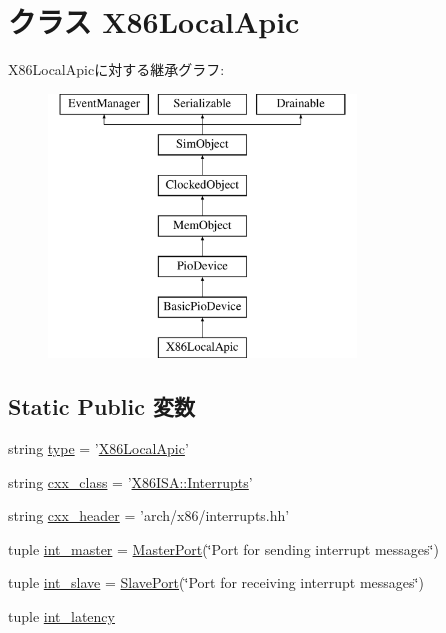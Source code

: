 \hypertarget{classX86LocalApic_1_1X86LocalApic}{
\section{クラス X86LocalApic}
\label{classX86LocalApic_1_1X86LocalApic}
}
X86LocalApicに対する継承グラフ:\begin{figure}[H]
\begin{center}
\leavevmode
\includegraphics[height=7cm]{classX86LocalApic_1_1X86LocalApic}
\end{center}
\end{figure}
\subsection*{Static Public 変数}
\begin{DoxyCompactItemize}
\item 
string \hyperlink{classX86LocalApic_1_1X86LocalApic_acce15679d830831b0bbe8ebc2a60b2ca}{type} = '\hyperlink{classX86LocalApic_1_1X86LocalApic}{X86LocalApic}'
\item 
string \hyperlink{classX86LocalApic_1_1X86LocalApic_a58cd55cd4023648e138237cfc0822ae3}{cxx\_\-class} = '\hyperlink{classX86ISA_1_1Interrupts}{X86ISA::Interrupts}'
\item 
string \hyperlink{classX86LocalApic_1_1X86LocalApic_a17da7064bc5c518791f0c891eff05fda}{cxx\_\-header} = 'arch/x86/interrupts.hh'
\item 
tuple \hyperlink{classX86LocalApic_1_1X86LocalApic_a45501c166fdfc0ea01a04909a5afa425}{int\_\-master} = \hyperlink{classm5_1_1params_1_1MasterPort}{MasterPort}(\char`\"{}Port for sending interrupt messages\char`\"{})
\item 
tuple \hyperlink{classX86LocalApic_1_1X86LocalApic_a6ffdad295642dbd667b85cc90450633b}{int\_\-slave} = \hyperlink{classm5_1_1params_1_1SlavePort}{SlavePort}(\char`\"{}Port for receiving interrupt messages\char`\"{})
\item 
tuple \hyperlink{classX86LocalApic_1_1X86LocalApic_a4843e32273ec8c1b9da3ce36ac4cd439}{int\_\-latency}
\end{DoxyCompactItemize}


